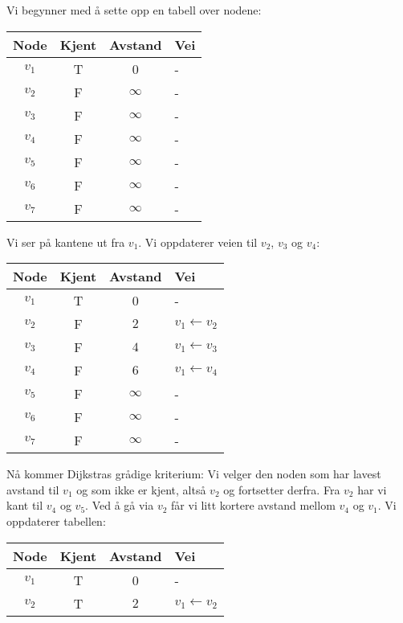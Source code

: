 \begin{example}
\noindent Vi begynner med å sette opp en tabell over nodene:
\begin{center}
\begin{tabular}{c | c | c | l}
	 Node   & Kjent & Avstand    & Vei \\ \hline
	$ v_1 $ & T     & 0          & -   \\
	$ v_2 $ & F     & $ \infty $ & -   \\
	$ v_3 $ & F     & $ \infty $ & -   \\
	$ v_4 $ & F     & $ \infty $ & -   \\
	$ v_5 $ & F     & $ \infty $ & -   \\
	$ v_6 $ & F     & $ \infty $ & -   \\
	$ v_7 $ & F     & $ \infty $ & -
\end{tabular}
\end{center}
Vi ser på kantene ut fra $ v_1 $. Vi oppdaterer veien til $ v_2 $, $ v_3 $ og $ v_4 $:
\begin{center}
\begin{tabular}{c | c | c | l}
	 Node   & Kjent & Avstand    & Vei                    \\ \hline
	$ v_1 $ & T     & 0          & -                      \\
	$ v_2 $ & F     & $ 2 $      & $ v_1 \leftarrow v_2 $ \\
	$ v_3 $ & F     & $ 4 $      & $ v_1 \leftarrow v_3 $ \\
	$ v_4 $ & F     & $ 6 $      & $ v_1 \leftarrow v_4 $ \\
	$ v_5 $ & F     & $ \infty $ & -                      \\
	$ v_6 $ & F     & $ \infty $ & -                      \\
	$ v_7 $ & F     & $ \infty $ & -
\end{tabular}
\end{center}
Nå kommer Dijkstras grådige kriterium: Vi velger den noden som har lavest avstand til $ v_1 $ og som ikke er kjent, altså $ v_2 $ og fortsetter derfra. Fra $ v_2 $ har vi kant til $ v_4 $ og $ v_5 $. Ved å gå via $ v_2 $ får vi litt kortere avstand mellom $ v_4 $ og $ v_1 $. Vi oppdaterer tabellen:
\begin{center}
\begin{tabular}{c | c | c | l}
	 Node   & Kjent & Avstand    & Vei                                   \\ \hline
	$ v_1 $ & T     & 0          & -                                     \\
	$ v_2 $ & T     & $ 2 $      & $ v_1 \leftarrow v_2 $                \\

\end{tabular}
\end{center}
\end{example}
